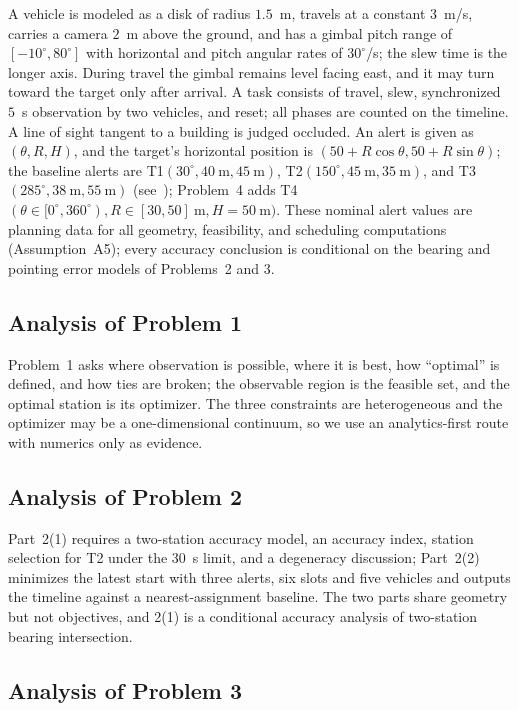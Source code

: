 A vehicle is modeled as a disk of radius $1.5$~m, travels at a constant $3$~m/s, carries a camera $2$~m above the ground, and has a gimbal pitch range of $[-10^\circ,80^\circ]$ with horizontal and pitch angular rates of $30^\circ$/s; the slew time is the longer axis. During travel the gimbal remains level facing east, and it may turn toward the target only after arrival. A task consists of travel, slew, synchronized $5$~s observation by two vehicles, and reset; all phases are counted on the timeline. A line of sight tangent to a building is judged occluded. An alert is given as $(\theta,R,H)$, and the target's horizontal position is $(50+R\cos\theta,50+R\sin\theta)$; the baseline alerts are T1$(30^\circ,40~\mathrm{m},45~\mathrm{m})$, T2$(150^\circ,45~\mathrm{m},35~\mathrm{m})$, and T3$(285^\circ,38~\mathrm{m},55~\mathrm{m})$ (see~\cite{swmcm}); Problem~4 adds T4$(\theta\in[0^\circ,360^\circ),R\in[30,50]~\mathrm{m},H=50~\mathrm{m})$. These nominal alert values are planning data for all geometry, feasibility, and scheduling computations (Assumption~A5); every accuracy conclusion is conditional on the bearing and pointing error models of Problems~2 and 3.

\subsection{Analysis of Problem 1}

Problem~1 asks where observation is possible, where it is best, how ``optimal'' is defined, and how ties are broken; the observable region is the feasible set, and the optimal station is its optimizer. The three constraints are heterogeneous and the optimizer may be a one-dimensional continuum, so we use an analytics-first route with numerics only as evidence.

\subsection{Analysis of Problem 2}

Part~2(1) requires a two-station accuracy model, an accuracy index, station selection for T2 under the 30~s limit, and a degeneracy discussion; Part~2(2) minimizes the latest start with three alerts, six slots and five vehicles and outputs the timeline against a nearest-assignment baseline. The two parts share geometry but not objectives, and 2(1) is a conditional accuracy analysis of two-station bearing intersection.

\subsection{Analysis of Problem 3}

